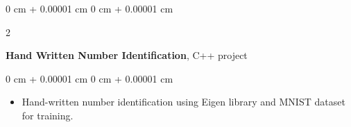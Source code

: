\documentclass[10pt, letterpaper]{article}
\newenvironment{highlights}{
    \begin{itemize}[
        topsep=0.10 cm,
        parsep=0.10 cm,
        partopsep=0pt,
        itemsep=0.05cm,
        leftmargin=0 cm + 10pt
    ]
}{
    \end{itemize}
} %
\newenvironment{onecolentry}{
    \begin{adjustwidth}{
        0 cm + 0.00001 cm
    }{
        0 cm + 0.00001 cm
    }
}{
    \end{adjustwidth}
} %
\newenvironment{twocolentry}[2][]{
    \onecolentry
    \def\secondColumn{#2}
    \setcolumnwidth{\fill, 4.5 cm}
    \begin{paracol}{2}
}{
    \switchcolumn \raggedleft \secondColumn
    \end{paracol}
    \endonecolentry
} %
\begin{document}
        \vspace{0.2 cm}

        \begin{twocolentry}{
            2017
        }
            \textbf{Hand Written Number Identification}, C++ project\end{twocolentry}

        \vspace{0.10 cm}
        \begin{onecolentry}
            \begin{highlights}
                \item Hand-written number identification using Eigen library and MNIST dataset for training.
            \end{highlights}
        \end{onecolentry}    
\end{document}
